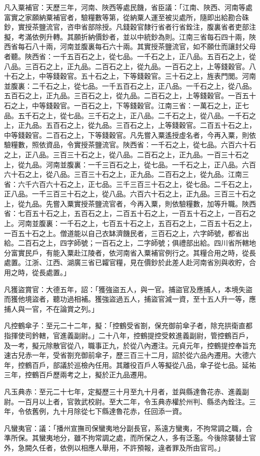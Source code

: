 \begin{pinyinscope}
 凡入粟補官：天歷三年，河南、陜西等處民饑，省臣議：「江南、陜西、河南等處富實之家願納粟補官者，驗糧數等第，從納粟人運至被災處所，隨即出給勘合硃鈔，實授茶鹽流官，咨申省部除授。凡錢穀官隸行省者行省銓注，腹裏省者吏部注擬，考滿依例升轉。其願折納價鈔者，並以中統鈔為則。江南三省每石四十兩，陜西省每石八十兩，河南並腹裏每石六十兩。其實授茶鹽流官，如不願仕而讓封父母者聽。陜西省：一千五百石之上，從七品。一千石之上，正八品。五百石之上，從八品。三百石之上，正九品。二百石之上，從九品。一百石之上，上等錢穀官。八十石之上，中等錢穀官。五十石之上，下等錢穀官。三十石之上，旌表門閭。河南並腹裏：二千石之上，從七品。一千五百石之上，正八品。一千石之上，從八品。五百石之上，正九品。三百石之上，從九品。二百石之上，上等錢穀官。一百五十石之上，中等錢穀官。一百石之上，下等錢穀官。江南三省：一萬石之上，正七品。五千石之上，從七品。三千石之上，正八品。二千石之上，從八品。一千石之上，正九品。五百石之上，從九品。三百石之上，上等錢穀官。二百五十石之上，中等錢穀官。二百石之上，下等錢穀官。凡先嘗入粟遙授虛名者，今再入粟，則依驗糧數，照依資品，令實授茶鹽流官。陜西省：一千石之上，從七品。六百六十石之上，正八品。三百三十石之上，從八品。二百石之上，正九品。一百三十石之上，從九品。河南並腹裏：一千三百石之上，從七品。一千石之上，正八品。六百六十石之上，從八品。三百三十石之上，正九品。二百石之上，從九品。江南三省：六千六百六十石之上，正七品。三千三百三十石之上，從七品。二千石之上，正八品。一千三百三十石之上，從八品。六百六十石之上，正九品。三百三十石之上，從九品。先嘗入粟實授茶鹽流官者，今再入粟，則依驗糧數，加等升職。陜西省：七百五十石之上，五百石之上，二百五十石之上，一百五十石之上，一百石之上。河南並腹裏：一千石之上，七百五十石之上，五百石之上，二百五十石之上，一百五十石之上。僧道能以自己衣缽濟饑民者，三百石之上，六字師號，都省出給。二百石之上，四字師號；一百石之上，二字師號；俱禮部出給。四川省所轄地分富實民戶，有能入粟赴江陵者，依河南省入粟補官例行之。其糧合用之時，從長處置。江浙、江西、湖廣三省已糶官糧，見在價鈔於此差人赴河南省別與收貯，合用之時，從長處置。」



 凡獲盜賞官：大德五年，詔：「獲強盜五人，與一官。捕盜官及應捕人，本境失盜而獲他境盜者，聽功過相補。獲強盜過五人，捕盜官減一資，至十五人升一等，應捕人與一官，不在論賞之列。」



 凡控鶴傘子：至元二十二年，擬：「控鶴受省劄，保充御前傘子者，除充拱衛直都指揮使司鈐轄，官進義副尉。」二十八年，控鶴提控受敕進義副尉，管控鶴百戶，及一考，擬元除散官從八，職事正九，於從八內遷注。元貞元年，控鶴提控奉旨充速古兒赤一年，受省劄充御前傘子，歷三百三十二月，詔於從六品內遷用。大德六年，控鶴百戶，部議於巡檢內任用。其離役百戶人等擬從八品，傘子從七品。延祐三年，控鶴百戶歷兩考之上，擬於正九品遷用。



 凡玉典赤：至元二十七年，定擬歷三十月至九十月者，並與縣達魯花赤、進義副尉。一百月以上者，官敦武校尉。至大二年，令玉典赤權於州判、縣丞內銓注。三年，令依舊例，九十月除從七下縣達魯花赤，任回添一資。



 凡蠻夷官：議：「播州宣撫司保蠻夷地分副長官，系遠方蠻夷，不拘常調之職，合準所保。其蠻夷地分，雖不拘常調之處，而所保之人，多有泛濫。今後除襲替土官外，急闕久任者，依例以相應人舉用，不許預報，違者罪及所由官司。」



\end{pinyinscope}